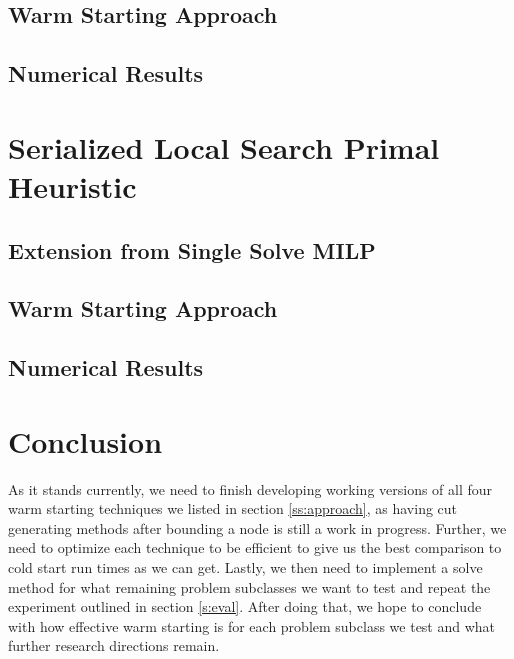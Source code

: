 \documentclass[10pt]{article}
\begin{document}
	\subsection{Warm Starting Approach}
	
	\subsection{Numerical Results}
	
	\section{Serialized Local Search Primal Heuristic}\label{s:sls}
	
	\subsection{Extension from Single Solve MILP}
	
	\subsection{Warm Starting Approach}
	
	\subsection{Numerical Results}
	
	\section{Conclusion}\label{s:conclusion}
	As it stands currently, we need to finish developing working versions of all four warm starting techniques we listed in section \ref{ss:approach}, as having cut generating methods after bounding a node is still a work in progress. Further, we need to optimize each technique to be efficient to give us the best comparison to cold start run times as we can get. Lastly, we then need to implement a solve method for what remaining problem subclasses we want to test and repeat the experiment outlined in section \ref{s:eval}. After doing that, we hope to conclude with how effective warm starting is for each problem subclass we test and what further research directions remain.
	
	\newpage
	
	
	
	
\end{document}
